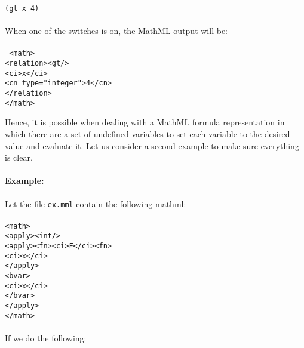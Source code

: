 \documentclass{article}
\begin{document}
{\tt (gt x 4)}
\\
\\
When one of the switches is on, the MathML output will be:
\\
\\
{\tt 
\hspace*{1mm}<math>\\
\hspace*{5mm}   <relation><gt/>\\
\hspace*{9mm}      <ci>x</ci>\\
\hspace*{9mm}      <cn type="integer">4</cn>\\
\hspace*{5mm}   </relation>\\
\hspace*{1mm}</math>\\}

Hence, it is possible when dealing with a MathML formula representation in
which there are a set of undefined variables to set each variable to the
desired value and evaluate it. Let us consider a second example to make sure
everything is clear.

\paragraph{Example:}

Let the file {\tt ex.mml} contain the following mathml:
\\
\\
{\tt               <math>\\
\hspace*{2mm}       <apply><int/>\\
\hspace*{5mm}        <apply><fn><ci>F</ci><fn>\\
\hspace*{9mm}         <ci>x</ci>\\
\hspace*{5mm}        </apply>\\
\hspace*{5mm}        <bvar>\\
\hspace*{9mm}         <ci>x</ci>\\
\hspace*{5mm}        </bvar>\\
\hspace*{2mm}       </apply>\\
                  </math>}  \\
\\
If we do the following:\\
\end{document}
